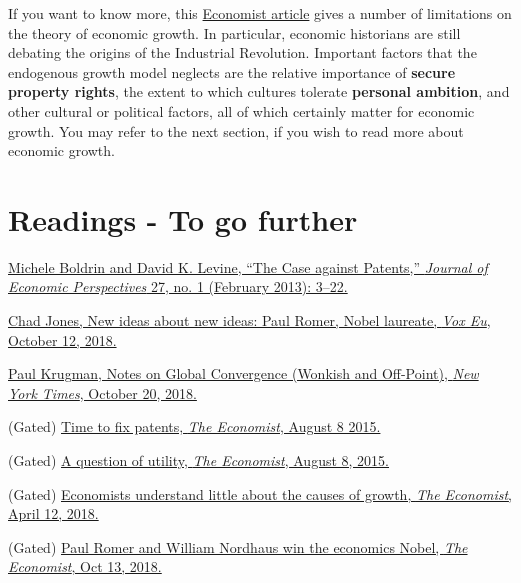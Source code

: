 \documentclass[]{book}
\begin{document}
If you want to know more, this
\href{https://www.economist.com/finance-and-economics/2018/04/12/economists-understand-little-about-the-causes-of-growth}{Economist
article} gives a number of limitations on the theory of economic growth.
In particular, economic historians are still debating the origins of the
Industrial Revolution. Important factors that the endogenous growth
model neglects are the relative importance of \textbf{secure property
rights}, the extent to which cultures tolerate \textbf{personal
ambition}, and other cultural or political factors, all of which
certainly matter for economic growth. You may refer to the next section,
if you wish to read more about economic growth.

\section*{Readings - To go further}\label{readings---to-go-further-4}

\href{https://doi.org/10.1257/jep.27.1.3}{Michele Boldrin and David K.
Levine, ``The Case against Patents,'' \emph{Journal of Economic
Perspectives} 27, no. 1 (February 2013): 3--22.}

\href{https://voxeu.org/article/new-ideas-about-new-ideas-paul-romer-nobel-laureate}{Chad
Jones, New ideas about new ideas: Paul Romer, Nobel laureate, \emph{Vox
Eu}, October 12, 2018.}

\href{https://search.proquest.com/docview/2123033147/1417E92D94B43EFPQ/3?accountid=14512}{Paul
Krugman, Notes on Global Convergence (Wonkish and Off-Point), \emph{New
York Times}, October 20, 2018.}

(Gated)
\href{https://www.economist.com/news/leaders/21660522-ideas-fuel-economy-todays-patent-systems-are-rotten-way-rewarding-them-time-fix}{Time
to fix patents, \emph{The Economist}, August 8 2015.}

(Gated)
\href{https://www.economist.com/international/2015/08/08/a-question-of-utility}{A
question of utility, \emph{The Economist}, August 8, 2015.}

(Gated)
\href{https://www.economist.com/finance-and-economics/2018/04/12/economists-understand-little-about-the-causes-of-growth}{Economists
understand little about the causes of growth, \emph{The Economist},
April 12, 2018.}

(Gated)
\href{https://www.economist.com/finance-and-economics/2018/10/13/paul-romer-and-william-nordhaus-win-the-economics-nobel?fsrc=scn/fb/te/bl/ed/paulromerandwilliamnordhauswintheeconomicsnobelfreeexchange}{Paul
Romer and William Nordhaus win the economics Nobel, \emph{The
Economist}, Oct 13, 2018.}
\end{document}
